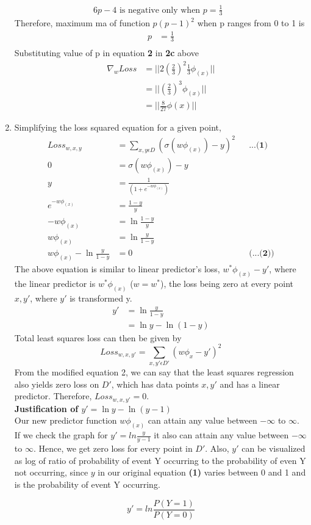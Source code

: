 \documentclass[12pt]{article}
\begin{document}
\begin{enumerate}[label=(\alph*)]
 \begin{align*}
 6p - 4 \text{ is negative only when $p = \frac{1}{3}$ }
 \end{align*}
 Therefore, maximum ma of function $p(p-1)^2$ when p ranges from 0 to 1 is
 \begin{align*}
 p &= \frac{1}{3} \\
 \end{align*}
 Substituting value of p in equation \textbf{2} in \textbf{2c} above
 \begin{align*}
 \nabla_w Loss &= || 2 (\frac{2}{3})^2 \frac{1}{3} \phi_{(x)} || \\
 &= || (\frac{2}{3})^3 \phi_{(x)} || \\
 &= || \frac{8}{27} \phi{(x)} ||
 \end{align*}
 \item 
 Simplifying the loss squared equation for a given point,
 \begin{align*}
 Loss_{w, x, y}&=\sum_{x, y \epsilon D}( \sigma(w\phi_{(x)}) - y)^2 && \textbf{...(1)}\\
 0 &= \sigma(w\phi_{(x)}) - y \\
 y &= \frac{1}{(1 + e^{-w\phi_{(x)}})} \\
e^{-w\phi_{(x)}} &= \frac{1 - y}{y} \\
-w\phi_{(x)} &= \ln \frac{1-y}{y} \\
w\phi_{(x)} &= \ln \frac{y}{1 - y} \\
w\phi_{(x)} - \ln \frac{y}{1-y} &= 0 && \textbf{(...(2))}
 \end{align*}
 The above equation is similar to linear predictor's loss, $w^*\phi_{(x)} - y'$, where the linear predictor is $w^*\phi_{(x)}$ ($w = w^*$), the loss being zero at every point $x, y'$, where $y'$ is transformed y.
  \begin{align*}
 y' &= \ln \frac{y}{1-y} \\
 &= \ln y - \ln(1 - y)
 \end{align*}
  Total least squares loss can then be given by  
	$$Loss_{w,x,y'} = \sum_{x, y' \epsilon D'} (w\phi_{x} - y')^2 $$ 
 From the modified equation 2, we can say that the  least squares regression also yields zero loss on $D'$, which has data points $x, y'$ and has a linear predictor. Therefore, $Loss_{w,x,y'} = 0$. \\
 
 \textbf{Justification of $y' = \ln y - \ln(y-1)$} \\
 Our new predictor function $w\phi_{(x)}$ can attain any value between $-\infty$ to $\infty$. If we check the graph for $y' = ln \frac{y}{y-1}$ it also can attain any value between $-\infty$ to $\infty$. Hence, we get zero loss for every point in $D'$. Also, $y'$ can be visualized as log of ratio of probability of event Y occurring to the probability of even Y not occurring, since $y$ in our original equation \textbf{(1)} varies between 0 and 1 and is the probability of event Y occurring.
 
 $$ y' = ln \frac{P (Y = 1)}{P (Y = 0)} $$
 
\end{enumerate} 
\end{document}
